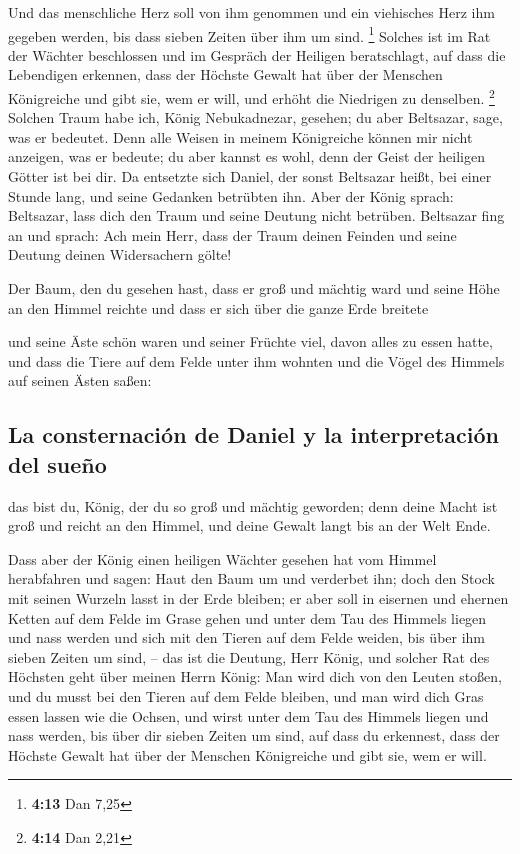  Und das menschliche Herz soll von ihm genommen und ein
viehisches Herz ihm gegeben werden, bis dass sieben Zeiten über ihm um
sind. \footnote{\textbf{4:13} Dan 7,25}  Solches ist im
Rat der Wächter beschlossen und im Gespräch der Heiligen beratschlagt,
auf dass die Lebendigen erkennen, dass der Höchste Gewalt hat über der
Menschen Königreiche und gibt sie, wem er will, und erhöht die Niedrigen
zu denselben. \footnote{\textbf{4:14} Dan 2,21}  Solchen
Traum habe ich, König Nebukadnezar, gesehen; du aber Beltsazar, sage,
was er bedeutet. Denn alle Weisen in meinem Königreiche können mir nicht
anzeigen, was er bedeute; du aber kannst es wohl, denn der Geist der
heiligen Götter ist bei dir.  Da entsetzte sich Daniel,
der sonst Beltsazar heißt, bei einer Stunde lang, und seine Gedanken
betrübten ihn. Aber der König sprach: Beltsazar, lass dich den Traum und
seine Deutung nicht betrüben. Beltsazar fing an und sprach: Ach mein
Herr, dass der Traum deinen Feinden und seine Deutung deinen
Widersachern gölte!

 Der Baum, den du gesehen hast, dass er groß und mächtig
ward und seine Höhe an den Himmel reichte und dass er sich über die
ganze Erde breitete

 und seine Äste schön waren und seiner Früchte viel,
davon alles zu essen hatte, und dass die Tiere auf dem Felde unter ihm
wohnten und die Vögel des Himmels auf seinen Ästen saßen:

\hypertarget{la-consternaciuxf3n-de-daniel-y-la-interpretaciuxf3n-del-sueuxf1o}{%
\subsection{La consternación de Daniel y la interpretación del
sueño}\label{la-consternaciuxf3n-de-daniel-y-la-interpretaciuxf3n-del-sueuxf1o}}

 das bist du, König, der du so groß und mächtig geworden;
denn deine Macht ist groß und reicht an den Himmel, und deine Gewalt
langt bis an der Welt Ende.

 Dass aber der König einen heiligen Wächter gesehen hat
vom Himmel herabfahren und sagen: Haut den Baum um und verderbet ihn;
doch den Stock mit seinen Wurzeln lasst in der Erde bleiben; er aber
soll in eisernen und ehernen Ketten auf dem Felde im Grase gehen und
unter dem Tau des Himmels liegen und nass werden und sich mit den Tieren
auf dem Felde weiden, bis über ihm sieben Zeiten um sind, --
 das ist die Deutung, Herr König, und solcher Rat des
Höchsten geht über meinen Herrn König:  Man wird dich von
den Leuten stoßen, und du musst bei den Tieren auf dem Felde bleiben,
und man wird dich Gras essen lassen wie die Ochsen, und wirst unter dem
Tau des Himmels liegen und nass werden, bis über dir sieben Zeiten um
sind, auf dass du erkennest, dass der Höchste Gewalt hat über der
Menschen Königreiche und gibt sie, wem er will.

